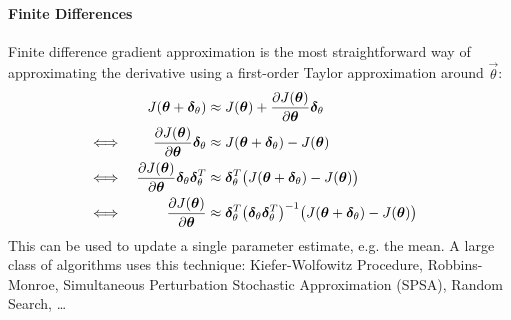 				\paragraph{Finite Differences}
					Finite difference gradient approximation is the most straightforward way of approximating the derivative using a first-order Taylor approximation around \(\vec{\theta}\):
					\begin{align*}
						                                                                              &                                                                                                                                                              &
						J(\bm{\theta} + \bm{\delta}_\theta)                                         & \approx J(\bm{\theta}) + \pdv{J(\bm{\theta})}{\bm{\theta}} \bm{\delta}_\theta                                                                            & \\
						\iff                                                                          &                                                                                                                                                              &
						\pdv{J(\bm{\theta})}{\bm{\theta}} \bm{\delta}_\theta                       & \approx J(\bm{\theta} + \bm{\delta}_\theta) - J(\bm{\theta})                                                                                              & \\
						\iff                                                                          &                                                                                                                                                              &
						\pdv{J(\bm{\theta})}{\bm{\theta}} \bm{\delta}_\theta \bm{\delta}_\theta^T & \approx \bm{\delta}_\theta^T \big( J(\bm{\theta} + \bm{\delta}_\theta) - J(\bm{\theta}) \big)                                                            & \\
						\iff                                                                          &                                                                                                                                                              &
						\pdv{J(\bm{\theta})}{\bm{\theta}}                                           & \approx \bm{\delta}_\theta^T \big( \bm{\delta}_\theta \bm{\delta}_\theta^T \big)^{-1} \big( J(\bm{\theta} + \bm{\delta}_\theta) - J(\bm{\theta}) \big) &
					\end{align*}
					This can be used to update a single parameter estimate, e.g. the mean. A large class of algorithms uses this technique: Kiefer-Wolfowitz Procedure, Robbins-Monroe, Simultaneous Perturbation Stochastic Approximation (SPSA), Random Search, \dots

